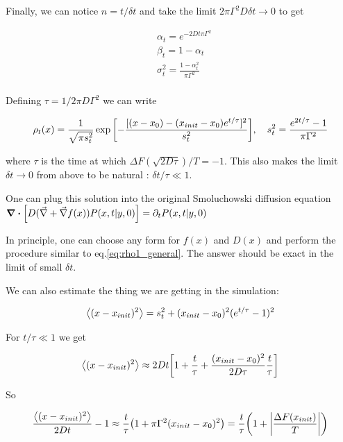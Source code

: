 \documentclass[a4paper,12pt]{article} %
\begin{document}
Finally, we can notice $n = t/\delta t$ and take the limit $2 \pi \Gamma^2 D \delta t \to 0$ to get

\begin{equation}
\begin{aligned}
& \alpha_t = e^{-2 D t \pi \Gamma^2} \\
& \beta_t = 1 - \alpha_t \\
& \sigma_t^2 = \frac{1-\alpha_t^2}{\pi \Gamma^2} \\
\end{aligned}
\end{equation}

Defining $\tau = 1/2 \pi D \Gamma^2$ we can write

\begin{equation}
\rho_t(x) = \frac{1}{\sqrt{\pi s_t^2}}  \exp \qty[-\frac{[(x - x_0) - (x_{init} - x_0) e^{t / \tau}]^2}{s_t^2}], \hspace{10pt} s_t^2 = \frac{e^{2t / \tau} - 1}{\pi \Gamma^2}
\end{equation}

where $\tau$ is the time at which $\Delta F(\sqrt{2 D \tau}) / T = -1$. This also makes the limit $\delta t \to 0$ from above to be natural : $\delta t / \tau \ll 1$.

One can plug this solution into the original Smoluchowski diffusion equation $\div\qty[D(\vec{\nabla} + \vec{\nabla} f(x))P(x,t|y,0)] = \partial_t P(x,t|y,0)$

In principle, one can choose any form for $f(x)$ and $D(x)$ and perform the procedure similar to eq.\eqref{eq:rho1_general}. The answer should be exact in the limit of small $\delta t$.

We can also estimate the thing we are getting in the simulation:

\begin{equation}
\expval{(x - x_{init})^2} = s_t^2 + (x_{init} - x_0)^2 (e^{t/\tau}-1)^2
\end{equation}

For $t/\tau \ll 1$ we get

\begin{equation}
\expval{(x - x_{init})^2} \approx 2 D t \qty[1 + \frac{t}{\tau} + \frac{(x_{init} - x_0)^2}{2 D \tau} \frac{t}{\tau}]
\end{equation}

So

\begin{equation}
\frac{\expval{(x - x_{init})^2}}{2 D t} - 1 \approx \frac{t}{\tau} \qty(1 + \pi \Gamma^2 (x_{init} - x_0)^2) = \frac{t}{\tau} \qty(1 + \abs{\frac{\Delta F(x_{init})}{T}}) 
\end{equation}
\end{document}
